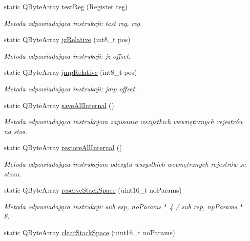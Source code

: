 \begin{DoxyCompactItemize}
static Q\-Byte\-Array \hyperlink{class_code_defines_a97da0ebe2a72b85e4cf678cf07fec4e1}{test\-Reg} (Register reg)
\begin{DoxyCompactList}\small\item\em Metoda odpowiadająca instrukcji\-: test reg, reg. \end{DoxyCompactList}\item 
static Q\-Byte\-Array \hyperlink{class_code_defines_ad92e4b0ee88740626ad9e73b0b170a14}{jz\-Relative} (int8\-\_\-t pos)
\begin{DoxyCompactList}\small\item\em Metoda odpowiadająca instrukcji\-: jz offset. \end{DoxyCompactList}\item 
static Q\-Byte\-Array \hyperlink{class_code_defines_aff433a64828802d6500a26769b3696be}{jmp\-Relative} (int8\-\_\-t pos)
\begin{DoxyCompactList}\small\item\em Metoda odpowiadająca instrukcji\-: jmp offset. \end{DoxyCompactList}\item 
static Q\-Byte\-Array \hyperlink{class_code_defines_a03a66f6808af85b08ef4ed8777c29e5e}{save\-All\-Internal} ()
\begin{DoxyCompactList}\small\item\em Metoda odpowiadająca instrukcjom zapisania wszystkich wewnętrznych rejestrów na stos. \end{DoxyCompactList}\item 
static Q\-Byte\-Array \hyperlink{class_code_defines_abc7f95cd1e8764eca2532184e359f02c}{restore\-All\-Internal} ()
\begin{DoxyCompactList}\small\item\em Metoda odpowiadająca instrukcjom odczytu wszystkich wewnętrznych rejestrów ze stosu. \end{DoxyCompactList}\item 
static Q\-Byte\-Array \hyperlink{class_code_defines_a7e7d98d34774cfc4c064b708e90e106b}{reserve\-Stack\-Space} (uint16\-\_\-t no\-Params)
\begin{DoxyCompactList}\small\item\em Metoda odpowiadająca instrukcji\-: sub esp, no\-Params $\ast$ 4 / sub rsp, np\-Params $\ast$ 8. \end{DoxyCompactList}\item 
static Q\-Byte\-Array \hyperlink{class_code_defines_ad8345f54b25fe8d87e1cc11832832133}{clear\-Stack\-Space} (uint16\-\_\-t no\-Params)

\end{DoxyCompactItemize}
